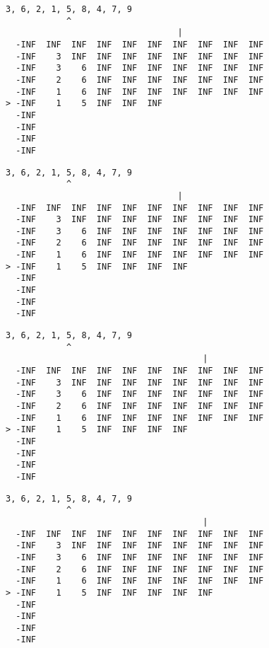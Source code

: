 { \begin{verbatim}
3, 6, 2, 1, 5, 8, 4, 7, 9
            ^
                                  |
  -INF  INF  INF  INF  INF  INF  INF  INF  INF  INF
  -INF    3  INF  INF  INF  INF  INF  INF  INF  INF
  -INF    3    6  INF  INF  INF  INF  INF  INF  INF
  -INF    2    6  INF  INF  INF  INF  INF  INF  INF
  -INF    1    6  INF  INF  INF  INF  INF  INF  INF
> -INF    1    5  INF  INF  INF                    
  -INF                                             
  -INF                                             
  -INF                                             
  -INF                                             
\end{verbatim} }

{ \begin{verbatim}
3, 6, 2, 1, 5, 8, 4, 7, 9
            ^
                                  |
  -INF  INF  INF  INF  INF  INF  INF  INF  INF  INF
  -INF    3  INF  INF  INF  INF  INF  INF  INF  INF
  -INF    3    6  INF  INF  INF  INF  INF  INF  INF
  -INF    2    6  INF  INF  INF  INF  INF  INF  INF
  -INF    1    6  INF  INF  INF  INF  INF  INF  INF
> -INF    1    5  INF  INF  INF  INF               
  -INF                                             
  -INF                                             
  -INF                                             
  -INF                                             
\end{verbatim} }

{ \begin{verbatim}
3, 6, 2, 1, 5, 8, 4, 7, 9
            ^
                                       |
  -INF  INF  INF  INF  INF  INF  INF  INF  INF  INF
  -INF    3  INF  INF  INF  INF  INF  INF  INF  INF
  -INF    3    6  INF  INF  INF  INF  INF  INF  INF
  -INF    2    6  INF  INF  INF  INF  INF  INF  INF
  -INF    1    6  INF  INF  INF  INF  INF  INF  INF
> -INF    1    5  INF  INF  INF  INF               
  -INF                                             
  -INF                                             
  -INF                                             
  -INF                                             
\end{verbatim} }

{ \begin{verbatim}
3, 6, 2, 1, 5, 8, 4, 7, 9
            ^
                                       |
  -INF  INF  INF  INF  INF  INF  INF  INF  INF  INF
  -INF    3  INF  INF  INF  INF  INF  INF  INF  INF
  -INF    3    6  INF  INF  INF  INF  INF  INF  INF
  -INF    2    6  INF  INF  INF  INF  INF  INF  INF
  -INF    1    6  INF  INF  INF  INF  INF  INF  INF
> -INF    1    5  INF  INF  INF  INF  INF          
  -INF                                             
  -INF                                             
  -INF                                             
  -INF                                             
\end{verbatim} }

